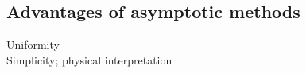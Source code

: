 \documentclass[twocolumn,secnumarabic,amssymb, nobibnotes, aps, prd]{revtex4-1}
\begin{document}

\subsection{Advantages of asymptotic methods}
Uniformity\\
Simplicity; physical interpretation
\end{document}
